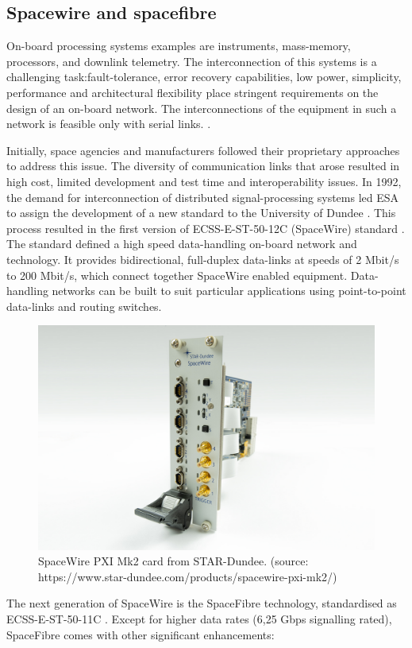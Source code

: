 \subsection{Spacewire and spacefibre}\label{subsubsec:spfi}
On-board processing systems examples are instruments, mass-memory, processors, and downlink telemetry. The interconnection of this systems is a challenging task:fault-tolerance, error recovery capabilities, low power, simplicity, performance and architectural flexibility place stringent requirements on the design of an on-board network. The interconnections of the equipment in such a network is feasible only with serial links. \cite{Athavale2005}.\par
Initially, space agencies and manufacturers followed their proprietary approaches to address this issue. The diversity of communication links that arose resulted in high cost, limited development and test time and interoperability issues. In 1992, the demand for interconnection of distributed signal-processing systems led ESA to assign the development of a new standard to the University of Dundee \cite{Parkes2012}. This process resulted in the first version of ECSS-E-ST-50-12C (SpaceWire) standard \cite{spwire}.
The standard defined a high speed data-handling on-board network and technology. It provides bidirectional, full-duplex data-links at speeds of 2 Mbit/s to 200 Mbit/s, which connect together SpaceWire enabled equipment. Data-handling networks can be built to suit particular applications using point-to-point data-links and routing switches.\par
	\begin{figure}
		\centering
		\includegraphics[width=0.6\linewidth]{Figures/pxi_interface_8hp_front.jpg}
		\caption{SpaceWire PXI Mk2 card from STAR-Dundee. (source: https://www.star-dundee.com/products/spacewire-pxi-mk2/)}
		\label{fig:A}
	\end{figure}
The next generation of SpaceWire is the SpaceFibre technology, standardised as ECSS-E-ST-50-11C \cite{spfibre}. Except for higher data rates (6,25 Gbps signalling rated), SpaceFibre comes with other significant enhancements:
